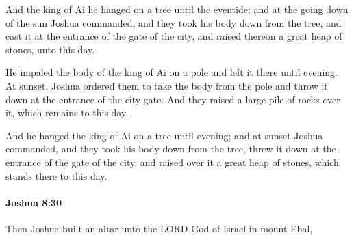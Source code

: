 			\begin{versebox}
					\item[BHS] 
					\item[ASV] And the king of Ai he hanged on a tree until the eventide: and at the going down of the sun Joshua commanded, and they took his body down from the tree, and cast it at the entrance of the gate of the city, and raised thereon a great heap of stones, unto this day.
					\item[NIV] He impaled the body of the king of Ai on a pole and left it there until evening. At sunset, Joshua ordered them to take the body from the pole and throw it down at the entrance of the city gate. And they raised a large pile of rocks over it, which remains to this day.
					\item[NRSV] And he hanged the king of Ai on a tree until evening; and at sunset Joshua commanded, and they took his body down from the tree, threw it down at the entrance of the gate of the city, and raised over it a great heap of stones, which stands there to this day.
			\end{versebox}

		\paragraph{Joshua 8:30} %
			\label{JOSHUA-8-30}

			Then Joshua built an altar unto the LORD God of Israel in mount Ebal,

